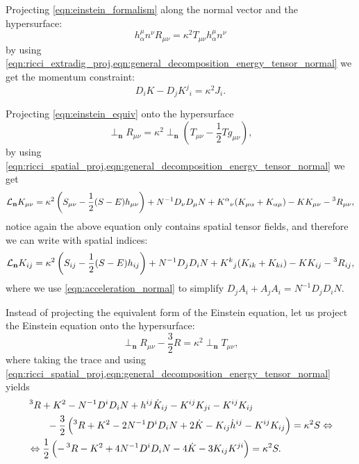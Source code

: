 Projecting \cref{eqn:einstein_formalism} along the normal vector and the hypersurface:
\begin{equation}
    h^\mu_\alpha n^\nu R_{\mu\nu}=\kappa^2 T_{\mu\nu} h^\mu_\alpha n^\nu
\end{equation}
by using \cref{eqn:ricci_extradig_proj,eqn:general_decomposition_energy_tensor_normal} we get the momentum constraint:
\begin{equation}
    D_i K - D_j K^j{}_i =\kappa^2 J_i.
\end{equation}
 

Projecting \cref{eqn:einstein_equiv} onto the hypersurface
\begin{equation}
    \perp_{\mathbf{n}}R_{\mu\nu}=\kappa^2\perp_{\mathbf{n}}\left(T_{\mu\nu}-\frac{1}{2}T g_{\mu\nu}\right),
\end{equation}
by using \cref{eqn:ricci_spatial_proj,eqn:general_decomposition_energy_tensor_normal} we get
\begin{equation}
    \mathcal{L}_{\mathbf{n}}K_{\mu\nu}=\kappa^2\left(S_{\mu\nu}-\frac{1}{2}(S-E)h_{\mu\nu}\right)+N^{-1}D_\nu D_\mu N + K^\alpha{}_\nu(K_{\mu\alpha}+K_{\alpha\mu}) - KK_{\mu\nu}-\prescript{3}{}R_{\mu\nu},
    \nonumber
\end{equation}
notice again the above equation only contains spatial tensor fields, and therefore we can write with spatial indices:
\begin{equation}
    \mathcal{L}_{\mathbf{n}}K_{ij}=\kappa^2\left(S_{ij}-\frac{1}{2}(S-E)h_{ij}\right)+N^{-1}D_j D_i N + K^k{}_j(K_{i k}+K_{k i}) - KK_{ij}-\prescript{3}{}R_{ij},
\end{equation}
where we use \cref{eqn:acceleration_normal} to simplify $D_jA_i+A_jA_i=N^{-1}D_j D_i N$.

Instead of projecting the equivalent form of the Einstein equation, let us project the Einstein equation onto the hypersurface:
\begin{equation}
    \perp_{\mathbf{n}}R_{\mu\nu}-\frac{3}{2}R=\kappa^2  \perp_{\mathbf{n}} T_{\mu\nu},
\end{equation}
where taking the trace and using \cref{eqn:ricci_spatial_proj,eqn:general_decomposition_energy_tensor_normal} yields
\begin{align}
    &\prescript{3}{}R+K^2- N^{-1}D^i D_i N + h^{ij}\dot{K}_{ij}-K^{ij}K_{ji}-K^{ij}K_{ij}\\
    &\quad\quad- \frac{3}{2}\left(\prescript{3}{}R+K^2-  2N^{-1}D^i D_i N + 2\dot{K}-K_{ij}\dot{h}^{ij}-K^{ij}K_{ij}\right)=\kappa^2 S\Leftrightarrow\\
    &\Leftrightarrow \frac{1}{2}\left(-\prescript{3}{}R-K^2+ 4N^{-1}D^i D_i N -4 \dot{K}-3K_{ij}K^{ji}\right)=\kappa^2 S.
    \label{eqn:pressure_equation_normal}
\end{align}

